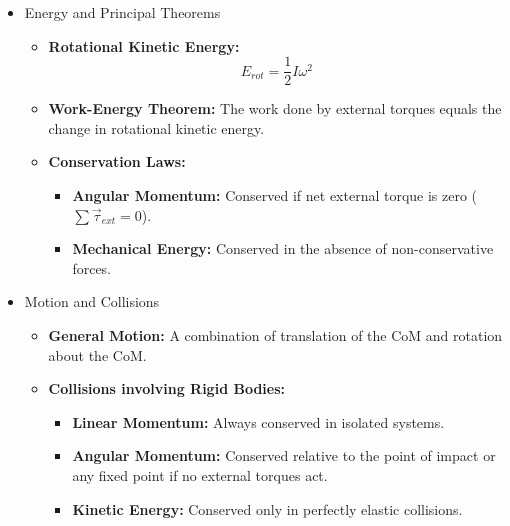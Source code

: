 \documentclass[t,aspectratio=169]{beamer}
\begin{document}
\begin{frame}
\begin{itemize}
\pagebreak
\item Energy and Principal Theorems
\begin{itemize}
    \item \textbf{Rotational Kinetic Energy:} 
    \[ E_{rot} = \frac{1}{2} I \omega^2 \]
    \item \textbf{Work-Energy Theorem:} The work done by external torques equals the change in rotational kinetic energy.
    \item \textbf{Conservation Laws:} 
    \begin{itemize}
        \item \textbf{Angular Momentum:} Conserved if net external torque is zero ($\sum \vec{\tau}_{ext} = 0$).
        \item \textbf{Mechanical Energy:} Conserved in the absence of non-conservative forces.
    \end{itemize}
\end{itemize}

\pagebreak
\item Motion and Collisions
\begin{itemize}
    \item \textbf{General Motion:} A combination of translation of the CoM and rotation about the CoM.
    \item \textbf{Collisions involving Rigid Bodies:}
    \begin{itemize}
        \item \textbf{Linear Momentum:} Always conserved in isolated systems.
        \item \textbf{Angular Momentum:} Conserved relative to the point of impact or any fixed point if no external torques act.
        \item \textbf{Kinetic Energy:} Conserved only in perfectly elastic collisions.
    \end{itemize}
  \end{itemize}

\end{itemize}

\end{frame}

\end{document}
